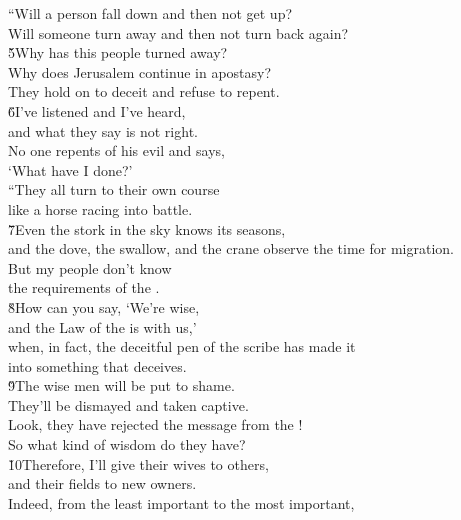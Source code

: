 \begin{poetry}
\poeml ``Will a person fall down and then not get up? \\
\poemll    Will someone turn away and then not turn back again? \\
\poeml \v{5}Why has this people turned away? \\
\poemll    Why does Jerusalem continue in apostasy? \\
\poemlll       They hold on to deceit and refuse to repent. \\
\poeml \v{6}I've listened and I've heard, \\
\poemll    and what they say is not right. \\
\poeml No one repents of his evil and says, \\
\poemll    `What have I done?' \\
\poeml ``They all turn to their own course \\
\poemll    like a horse racing into battle. \\
\poeml \v{7}Even the stork in the sky knows its seasons, \\
\poemll    and the dove, the swallow, and the crane observe the time for migration. \\
\poeml But my people don't know \\
\poemll    the requirements of the . \\
\poeml \v{8}How can you say, `We're wise, \\
\poemll    and the Law of the  is with us,' \\
\poeml when, in fact, the deceitful pen of the scribe has made it \\
\poemll    into something that deceives. \\
\poeml \v{9}The wise men will be put to shame. \\
\poemll    They'll be dismayed and taken captive. \\
\poeml Look, they have rejected the message from the ! \\
\poemll    So what kind of wisdom do they have? \\
\poeml \v{10}Therefore, I'll give their wives to others, \\
\poemll    and their fields to new owners. \\
\poeml Indeed, from the least important to the most important, \\

\end{poetry}
